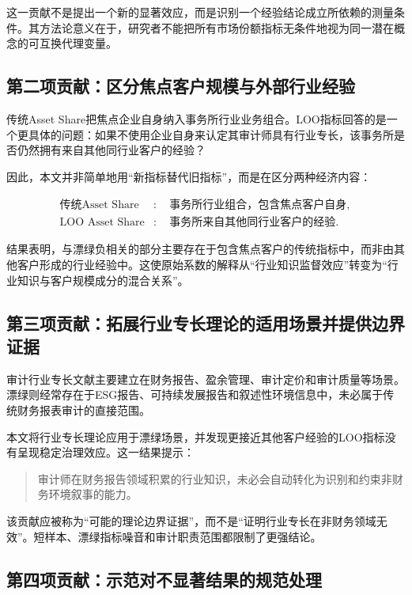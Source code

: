 \documentclass[12pt,a4paper]{article}
\begin{document}
这一贡献不是提出一个新的显著效应，而是识别一个经验结论成立所依赖的测量条件。其方法论意义在于，研究者不能把所有市场份额指标无条件地视为同一潜在概念的可互换代理变量。

\subsection{第二项贡献：区分焦点客户规模与外部行业经验}

传统Asset Share把焦点企业自身纳入事务所行业业务组合。LOO指标回答的是一个更具体的问题：如果不使用企业自身来认定其审计师具有行业专长，该事务所是否仍然拥有来自其他同行业客户的经验？

因此，本文并非简单地用“新指标替代旧指标”，而是在区分两种经济内容：

\begin{align}
\text{传统Asset Share} &:\quad \text{事务所行业组合，包含焦点客户自身},\\
\text{LOO Asset Share} &:\quad \text{事务所来自其他同行业客户的经验}.
\end{align}

结果表明，与漂绿负相关的部分主要存在于包含焦点客户的传统指标中，而非由其他客户形成的行业经验中。这使原始系数的解释从“行业知识监督效应”转变为“行业知识与客户规模成分的混合关系”。

\subsection{第三项贡献：拓展行业专长理论的适用场景并提供边界证据}

审计行业专长文献主要建立在财务报告、盈余管理、审计定价和审计质量等场景。漂绿则经常存在于ESG报告、可持续发展报告和叙述性环境信息中，未必属于传统财务报表审计的直接范围。

本文将行业专长理论应用于漂绿场景，并发现更接近其他客户经验的LOO指标没有呈现稳定治理效应。这一结果提示：

\begin{quote}
审计师在财务报告领域积累的行业知识，未必会自动转化为识别和约束非财务环境叙事的能力。
\end{quote}

该贡献应被称为“可能的理论边界证据”，而不是“证明行业专长在非财务领域无效”。短样本、漂绿指标噪音和审计职责范围都限制了更强结论。

\subsection{第四项贡献：示范对不显著结果的规范处理}
\end{document}

